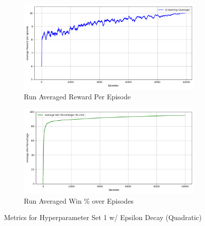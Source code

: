 \documentclass[a4paper,9pt]{scrartcl}
\begin{document}
\begin{figure}[H]
\centering
\begin{subfigure}[b]{0.45\textwidth}
\includegraphics[width=\textwidth]{images/q_learning_rewards_avg(2)(0).png}
\caption{Run Averaged Reward Per Episode}
\label{fig:rewards_avg}
\end{subfigure}
\hfill
\begin{subfigure}[b]{0.45\textwidth}
\includegraphics[width=\textwidth]{images/q_learning_win_percentage_avg(2)(0).png}
\caption{Run Averaged Win \% over Episodes}
\label{fig:win_percent_avg}
\end{subfigure}
\caption{Metrics for Hyperparameter Set 1 w/ Epsilon Decay (Quadratic)}
\label{fig:training_metrics}
\end{figure}
\end{document}

